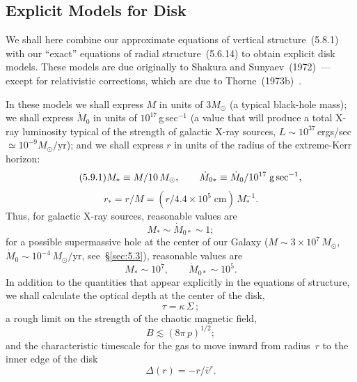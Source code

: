 
\subsection{Explicit Models for Disk}
\label{sec:5.9}

We shall here combine our approximate equations of vertical structure~(5.8.1)
with our ``exact'' equations of radial structure~(5.6.14) to obtain explicit disk
models.  These models are due originally to Shakura and Sunyaev~(1972)~\cite{ShakuraSunyaev1973}---except
for relativistic corrections, which are due to Thorne~(1973b)~\cite{Thorne1973b}.

In these models we shall express $M$ in units of $3M_\odot$ (a typical black-hole mass);
we shall express $\dot{M}_0$ in units of $10^{17}$\,g\,sec$^{-1}$
(a value that will produce
a total X-ray luminosity typical of the strength of galactic X-ray sources,
$L \sim 10^{37}$\,ergs/sec $\simeq 10^{-9}M_\odot/\text{yr}$);
and we shall express $r$ in units of the radius of the extreme-Kerr
horizon:
%
\begin{equation}
\tag{5.9.1}
M_* \equiv M/10\,M_\odot, \qquad
\dot{M}_{0*} \equiv \dot{M}_0/10^{17}\;\text{g\,sec}^{-1},
\end{equation}
%
\begin{equation}
r_* = r/M = (r/4.4 \times 10^5\;\text{cm})\,M_*^{-1}.
\end{equation}
%
Thus, for galactic X-ray sources, reasonable values are
%
\begin{equation}
\tag{5.9.2a}
M_* \sim \dot{M}_{0*} \sim 1;
\end{equation}
%
for a possible supermassive hole at the center of our Galaxy
($M \sim 3 \times 10^7\,M_\odot$,
$\dot{M}_0 \sim 10^{-4}\,M_\odot/\text{yr}$, see~\S\ref{sec:5.3}), reasonable values are
%
\begin{equation}
\tag{5.9.2b}
M_* \sim 10^7, \qquad \dot{M}_{0*} \sim 10^5.
\end{equation}
%
In addition to the quantities that appear explicitly in the equations of structure,
we shall calculate the optical depth at the center of the disk,
%
\begin{equation}
\tag{5.9.3}
\tau = \kappa\,\Sigma\,;
\end{equation}
%
a rough limit on the strength of the chaotic magnetic field,
%
\begin{equation}
\tag{5.9.4}
B \lesssim (8\pi\, p)^{1/2};
\end{equation}
%
and the characteristic timescale for the gas to move inward from radius~$r$ to the
inner edge of the disk
%
\begin{equation}
\tag{5.9.5}
\Delta(r) = -r/\bar{v}^r.
\end{equation}

